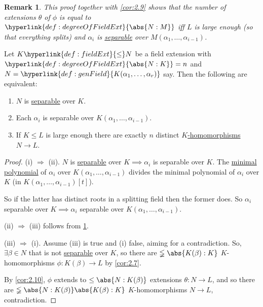 \documentclass{article}
\newtheorem{nremark}[nthm]{Remark}
\begin{document}
\begin{nremark}\label{rem:2.11}
    This proof together with \cref{cor:2.9} shows that the number of extensions $\theta$ of $\phi$ is equal to $\hyperlink{def:degreeOfFieldExt}{\abs{N:M}}$ iff $L$ is large enough (so that everything splits) and $\alpha_i$ is \hyperlink{def:separableExt}{separable} over \hyperlink{def:genField}{$M(\alpha_1, \dotsc, \alpha_{i-1})$}.
\end{nremark}

\begin{nlemma}\label{lem:2.12}
    Let $K \hyperlink{def:fieldExt}{\leq} N$ be a field extension with $\hyperlink{def:degreeOfFieldExt}{\abs{N:K}} = n$ and $N = \hyperlink{def:genField}{K(\alpha_1, \dotsc, \alpha_r)}$ say.
    Then the following are equivalent:
    \begin{enumerate}[label=(\roman*)]
        \item $N$ is \hyperlink{def:separableExt}{separable} over $K$.
        \item Each $\alpha_i$ is separable over $K(\alpha_1, \dotsc, \alpha_{i-1})$.
        \item If $K \leq L$ is large enough there are exactly $n$ distinct \hyperlink{def:homo}{$K$-homomorphisms} $N \to L$.
    \end{enumerate}
\end{nlemma}

\begin{proof}
    (i) $\Rightarrow$ (ii).
    $N$ is \hyperlink{def:separableExt}{separable} over $K \implies \alpha_i$ is separable over $K$.
    The \hyperlink{def:minimalPoly}{minimal polynomial} of $\alpha_i$ over $K(\alpha_1, \dotsc, \alpha_{i-1})$ divides the minimal polynomial of $\alpha_i$ over $K$ (in $K(\alpha_1, \dotsc, \alpha_{i-1})[t]$).

    So if the latter has distinct roots in a splitting field then the former does.
    So $\alpha_i$ separable over $K \implies \alpha_i$ separable over $K(\alpha_1, \dotsc, \alpha_{i-1})$.

    (ii) $\Rightarrow$ (iii) follows from \cref{rem:2.11}.

    (iii) $\Rightarrow$ (i). Assume (iii) is true and (i) false, aiming for a contradiction.
    So, $\exists \beta \in N$ that is not \hyperlink{def:separableExt}{separable} over $K$, so there are $\lneqq\abs{K(\beta):K}$ $K$-homomorphisms $\phi:K(\beta) \to L$ by \cref{cor:2.7}.

    By \cref{cor:2.10}, $\phi$ extends to $\leq \abs{N:K(\beta)}$ extensions $\theta: N \to L$, and so there are $\lneqq\abs{N:K(\beta)}\abs{K(\beta):K}$ $K$-homomorphisms $N\to L$, contradiction.
\end{proof}
\end{document}
